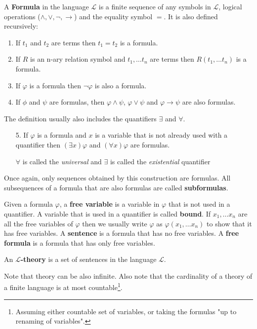 \begin{defn} A \textbf{Formula} in the language $\mathcal{L}$ is a finite sequence of any symbols in $\mathcal{L}$, logical operations ($\wedge, \vee, \neg, \rightarrow$) and the equality symbol $=$. It is also defined recursively:
	\begin{enumerate}
		\item If $t_1$ and $t_2$ are terms then $t_1=t_2$ is a formula.
		\item If $R$ is an n-ary relation symbol and $t_1, \dots t_n$ are terms then $R(t_1, \dots t_n)$ is a formula. 
		\item If $\varphi$ is a formula then $\neg\varphi$ is also a formula.
		\item If $\phi$ and $\psi$ are formulas, then $\varphi\wedge\psi$, $\varphi\vee\psi$ and $\varphi\rightarrow\psi$ are also formulas.
	\end{enumerate}
	The definition usually also includes the quantifiers $\exists$ and $\forall$. 
	\begin{enumerate}
		\item[5.] If $\varphi$ is a formula and $x$ is a variable that is not already used with a quantifier then $(\exists x)\varphi$ and $(\forall x)\varphi$ are formulas.
		
		$\forall$ is called the \textit{universal} and $\exists$ is called the \textit{existential} quantifier
	\end{enumerate}
Once again, only sequences obtained by this construction are formulas. All subsequences of a formula that are also formulas are called \textbf{subformulas}.
\end{defn}

\begin{defn} Given a formula $\varphi$, a \textbf{free variable} is a variable in $\varphi$ that is not used in a quantifier. A variable that is used in a quantifier is called \textbf{bound}. If $x_1,\dots x_n$ are all the free variables of $\varphi$ then we usually write $\varphi$ as $\varphi(x_1,\dots x_n)$ to show that it has free variables.  A \textbf{sentence} is a formula that has no free variables. A \textbf{free formula} is a formula that has only free variables.
\end{defn}

\begin{defn}An \textbf{$\mathcal{L}$-theory} is a set of sentences in the language $\mathcal{L}$.
\end{defn}

Note that theory can be also infinite. Also note that the cardinality of a theory of a finite language is at most countable\footnote{Assuming either countable set of variables, or taking the formulas "up to renaming of variables".}.

